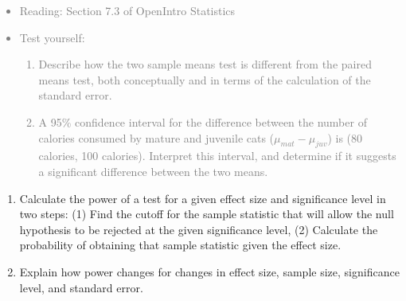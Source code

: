 \documentclass[11pt]{article}
\newcommand{\gray}[1]{\textcolor{gray}{#1}}
\begin{document}
\gray{
{\it
\vspace{-0.55cm}
\begin{itemize}
\renewcommand{\labelitemi}{{\textcolor{dark}{$\ast$}}}
\item Reading: Section 7.3 of OpenIntro Statistics
\item Test yourself:
\begin{enumerate}
\item Describe how the two sample means test is different from the paired means test, both conceptually and in terms of the calculation of the standard error.
\item A 95\% confidence interval for the difference between the number of calories consumed by mature and juvenile cats ($\mu_{mat} - \mu_{juv}$) is (80 calories, 100 calories). Interpret this interval, and determine if it suggests a significant difference between the two means.
\end{enumerate}
\end{itemize}
}}

%

\vspace{0.48cm}

%

\begin{enumerate}[resume]
\renewcommand\labelenumi{\textcolor{light}{\textbf{LO \theenumi.}}}

\item Calculate the power of a test for a given effect size and significance level in two steps: (1) Find the cutoff for the sample statistic that will allow the null hypothesis to be rejected at the given significance level, (2) Calculate the probability of obtaining that sample statistic given the effect size.

\item Explain how power changes for changes in effect size, sample size, significance level, and standard error.

\end{enumerate}

%

\vspace{0.48cm}
\end{document}
